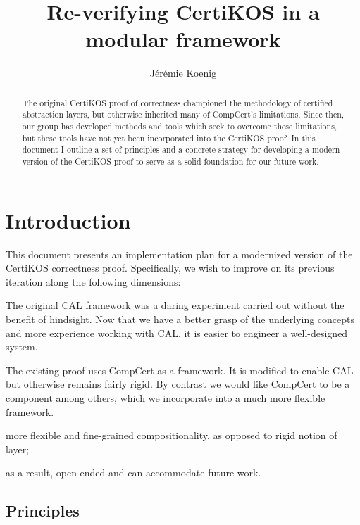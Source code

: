 \documentclass{article}
\title{Re-verifying CertiKOS in a modular framework}
\author{J\'er\'emie Koenig}
\begin{document}
\maketitle

\begin{abstract}
The original CertiKOS proof of correctness
championed the methodology of certified abstraction layers,
but otherwise inherited many of CompCert's limitations.
Since then,
our group has developed methods and tools
which seek to overcome these limitations,
but these tools
have not yet been incorporated into the CertiKOS proof.
In this document I outline
a set of principles and
a concrete strategy
for developing a modern version of the CertiKOS proof
to serve as a solid foundation
for our future work.
\end{abstract}

\tableofcontents

\section{Introduction} %

This document presents an implementation plan
for a modernized version of the CertiKOS correctness proof.
Specifically,
we wish to improve on its previous iteration
along the following dimensions:
\begin{description}
  \item[Focus on usability and best practices.]
    The original CAL framework was a daring experiment
    carried out without the benefit of hindsight.
    Now that we have a better grasp of the underlying concepts
    and more experience working with CAL,
    it is easier to engineer a well-designed system.
  \item[CompCert as a mere component.]
    The existing proof uses CompCert as a framework.
    It is modified to enable CAL but otherwise remains fairly rigid.
    By contrast we would like CompCert to be a component among others,
    which we incorporate into a much more flexible framework.
  \item more flexible and fine-grained compositionality, as opposed to rigid notion of layer;
  \item as a result, open-ended and can accommodate future work.
\end{description}

\subsection{Principles}
\end{document}
